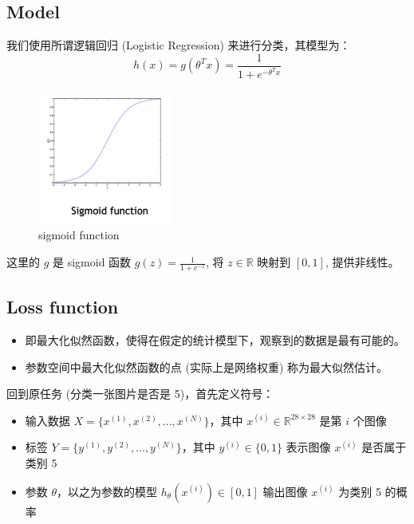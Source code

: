 \subsection{Model}
我们使用所谓逻辑回归 (Logistic Regression) 来进行分类，其模型为：
$$h(x) = g(\theta^T x) = \frac{1}{1 + e^{-\theta^T x}}$$

\begin{figure}[htbp]
    \centering
    \includegraphics[width=0.4\textwidth]{figures/sigmoid.png}
    \caption{sigmoid function}
    \label{fig:sigmoid}
\end{figure}

\begin{note}
    这里的 $g$ 是 sigmoid 函数 $g(z) = \frac{1}{1 + e^{-z}}$, 将 $z\in \mathbb{R}$ 映射到 $[0, 1]$, 提供非线性。
\end{note}
\subsection{Loss function}
\begin{definition}[最大似然估计]
    \begin{itemize}
        \item 即最大化似然函数，使得在假定的统计模型下，观察到的数据是最有可能的。
        \item 参数空间中最大化似然函数的点 (实际上是网络权重) 称为最大似然估计。
    \end{itemize}
\end{definition}
回到原任务 (分类一张图片是否是 5)，首先定义符号：

\begin{itemize}
    \item 输入数据 $X = \{x^{(1)}, x^{(2)}, ..., x^{(N)}\}$，其中 $x^{(i)} \in \mathbb{R}^{28 \times 28}$ 是第 $i$ 个图像  
    \item 标签 $Y = \{y^{(1)}, y^{(2)}, ..., y^{(N)}\}$，其中 $y^{(i)} \in \{0,1\}$ 表示图像 $x^{(i)}$ 是否属于类别 5  
    \item 参数 $\theta$，以之为参数的模型 $h_\theta(x^{(i)}) \in [0,1]$ 输出图像 $x^{(i)}$ 为类别 5 的概率  
\end{itemize}

